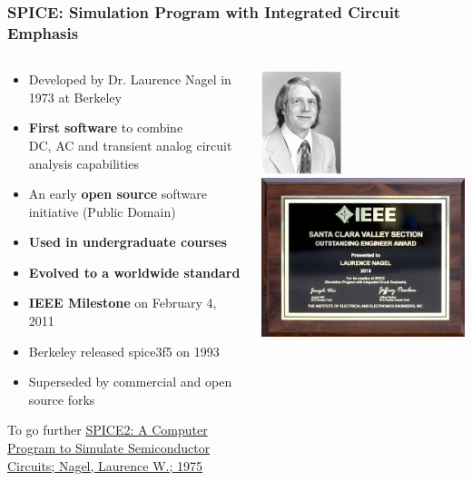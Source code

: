 
\begin{frame}
  \frametitle{SPICE: Simulation Program with Integrated Circuit Emphasis}
  \begin{columns}
    \begin{column}{.7\textwidth}
      \begin{itemize}
      \item Developed by Dr. Laurence Nagel in 1973 at Berkeley %
      \item \textbf{First software} to combine \\
        DC, AC and transient analog circuit analysis capabilities
      \item An early \textbf{open source} software initiative (Public Domain)
      \item \textbf{Used in undergraduate courses}
      \item \textbf{Evolved to a worldwide standard} %
      \item \textbf{IEEE Milestone} on February 4, 2011
      \item Berkeley released spice3f5 on 1993 %
      \item Superseded by commercial and open source forks
      \end{itemize}
      {\tiny To go further
        \href{https://www2.eecs.berkeley.edu/Pubs/TechRpts/1975/9602.html}%
        {SPICE2: A Computer Program to Simulate Semiconductor Circuits; Nagel, Laurence W.; 1975}
      }
    \end{column}
    \begin{column}{.3\textwidth}
      \begin{center}
        \includegraphics[height=3cm]{images/Larry-Nagel-portrait-young.png} \\[1cm]
        \includegraphics[width=.7\textwidth]{images/Nagel_Plaque-SCV-2016.png}

\end{center}
\end{column}
\end{columns}
\end{frame}
